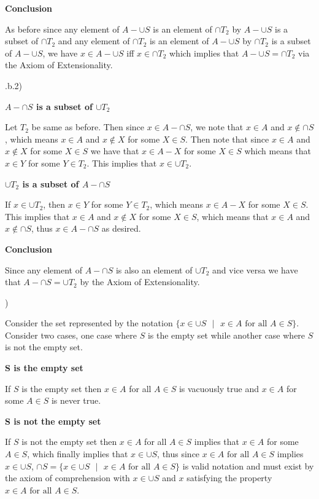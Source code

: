 \documentclass{article}
\begin{document}
\bigskip
\textbf{Conclusion}
\bigskip

As before since any element of $A - \cup S$ is an element of $\cap T_2$ by $A - \cup S$ is a subset of $\cap T_2$ and any element of $\cap T_2$ is an element of $A - \cup S$ by $\cap T_2$ is a subset of $A - \cup S$, we have $x \in A - \cup S$ iff $x \in \cap T_2$ which implies that $A - \cup S = \cap T_2$ via the Axiom of Extensionality.

.b.2)

\bigskip
\textbf{$A - \cap S$ is a subset of $\cup T_2$}
\bigskip

Let $T_2$ be same as before. Then since $x \in A - \cap S$, we note that $x \in A$ and $x \notin \cap S$, which means $x \in A$ and $x \notin X$ for some $X \in S$. Then note that since $x \in A$ and $x \notin X$ for some $X \in S$ we have that $x \in A - X$ for some $X \in S$ which means that $x \in Y$ for some $Y \in T_2$. This implies that $x \in \cup T_2$. 

\bigskip
\textbf{$\cup T_2$ is a subset of $A - \cap S$}
\bigskip

If $x \in \cup T_2$, then $x \in Y$ for some $Y \in T_2$, which means $x \in A - X$ for some $X \in S$. This implies that $x \in A$ and $x \notin X$ for some $X \in S$, which means that $x \in A$ and $x \notin \cap S$, thus $x \in A - \cap S$ as desired.

\bigskip
\textbf{Conclusion}
\bigskip

Since any element of $A - \cap S$ is also an element of $\cup T_2$ and vice versa we have that $A - \cap S = \cup T_2$ by the Axiom of Extensionality.

)

Consider the set represented by the notation $\{ x \in \cup S \text{ } | \text{ } x \in A \text{ for all } A \in S\}$. Consider two cases, one case where $S$ is the empty set while another case where $S$ is not the empty set. 

\medskip
\textbf{S is the empty set}
\medskip

If $S$ is the empty set then $x \in A$ for all $A \in S$ is vacuously true and $x \in A$ for some $A \in S$ is never true. 

\medskip
\textbf{S is not the empty set}
\medskip

If $S$ is not the empty set then $x \in A$ for all $A \in S$ implies that $x \in A$ for some $A \in S$, which finally implies that $x \in \cup S$, thus since $x \in A \text{ for all } A \in S$ implies $x \in \cup S$, $\cap S = \{ x \in \cup S \text{ } | \text{ } x \in A \text{ for all } A \in S\}$ is valid notation and must exist by the axiom of comprehension with $x \in \cup S$ and $x$ satisfying the property $x \in A \text{ for all } A \in S$. 
\end{document}
